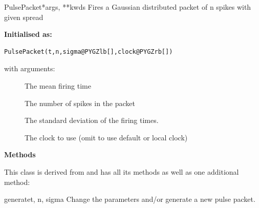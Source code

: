 \documentclass[letterpaper,10pt,english]{manual}
\begin{document}
\hypertarget{brian.PulsePacket}{}\begin{classdesc}{PulsePacket}{*args, **kwds}
Fires a Gaussian distributed packet of n spikes with given spread

\textbf{Initialised as:}

\begin{Verbatim}[commandchars=@\[\]]
PulsePacket(t,n,sigma@PYGZlb[],clock@PYGZrb[])
\end{Verbatim}

with arguments:
\begin{description}
\item[]
The mean firing time

\item[]
The number of spikes in the packet

\item[]
The standard deviation of the firing times.

\item[]
The clock to use (omit to use default or local clock)

\end{description}

\textbf{Methods}

This class is derived from \hyperlink{brian.SpikeGeneratorGroup}{} and has all its
methods as well as one additional method:

\hypertarget{brian.PulsePacket.generate}{}\begin{methoddesc}{generate}{t, n, sigma}
Change the parameters and/or generate a new pulse packet.
\end{methoddesc}
\end{classdesc}
\end{document}
